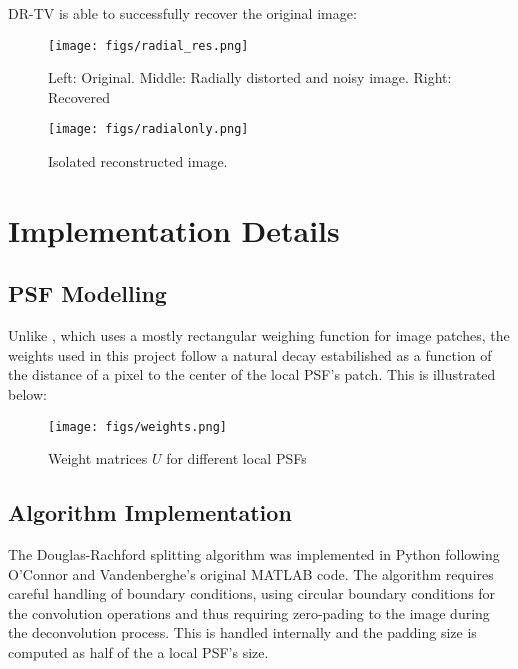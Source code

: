 \documentclass[sigconf]{acmart}
\begin{document}
DR-TV is able to successfully recover the original image:
\begin{figure}[h]
  \centering
  \texttt{[image: figs/radial\_res.png]}
  \caption{Left: Original. Middle: Radially distorted and noisy image. Right: Recovered}
  \label{fig:radialrescomp}
\end{figure}

\begin{figure}[h]
  \centering
  \texttt{[image: figs/radialonly.png]}
  \caption{Isolated reconstructed image.}
  \label{fig:radialresone}
\end{figure}



\section{Implementation Details}

\subsection{PSF Modelling}\label{app:PSFModel}
Unlike \cite{oconnor}, which uses a mostly rectangular weighing function for image patches, the weights used in this project follow a natural decay estabilished as a function of the distance of a pixel to the center of the local PSF's patch. This is illustrated below:
\begin{figure}[h]
  \centering
  \texttt{[image: figs/weights.png]}
  \caption{Weight matrices $U$ for different local PSFs}
  \label{fig:dr-randres}
\end{figure}

\subsection{Algorithm Implementation}\label{app:implementation}

The Douglas-Rachford splitting algorithm was implemented in Python following O'Connor and Vandenberghe's original MATLAB code. The algorithm requires careful handling of boundary conditions, using circular boundary conditions for the convolution operations and thus requiring zero-pading to the image during the deconvolution process. This is handled internally and the padding size is computed as half of the a local PSF's size.
\end{document}
